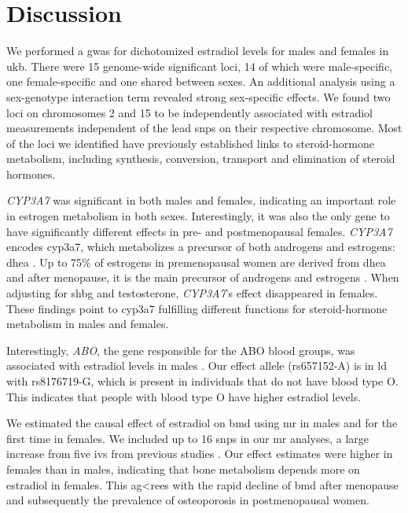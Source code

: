 \documentclass[draft]{scrbook}
\begin{document}
\section{Discussion} \label{sec:p1discussion}
We performed a \gls{gwas} for dichotomized estradiol levels for males and females in \gls{ukb}.
There were 15 genome-wide significant loci, 14 of which were male-specific, one female-specific and one shared between sexes.
An additional analysis using a sex-genotype interaction term revealed strong sex-specific effects.
We found two loci on chromosomes 2 and 15 to be independently associated with estradiol measurements independent of the lead \glspl{snp} on their respective chromosome.
Most of the loci we identified have previously established links to steroid-hormone metabolism, including synthesis, conversion, transport and elimination of steroid hormones.

\textit{CYP3A7} was significant in both males and females, indicating an important role in estrogen metabolism in both sexes.
Interestingly, it was also the only gene to have significantly different effects in pre- and postmenopausal females.
\textit{CYP3A7} encodes \gls{cyp3a7}, which metabolizes a precursor of both androgens and estrogens: \gls{dhea} \cite{Ohmori1998}.
Up to 75\% of estrogens in premenopausal women are derived from \gls{dhea} and after menopause, it is the main precursor of androgens and estrogens \cite{Simpson2001}.
When adjusting for \gls{shbg} and testosterone, \textit{CYP3A7}'s effect disappeared in females.
These findings point to \gls{cyp3a7} fulfilling different functions for steroid-hormone metabolism in males and females.

Interestingly, \textit{ABO}, the gene responsible for the ABO blood groups, was associated with estradiol levels in males \cite{Ogasawara1996}.
Our effect allele (rs657152-A) is in \gls{ld} with rs8176719-G, which is present in individuals that do not have blood type O.
This indicates that people with blood type O have higher estradiol levels.

We estimated the causal effect of estradiol on \gls{bmd} using \gls{mr} in males and for the first time in females.
We included up to 16 \glspl{snp} in our \gls{mr} analyses, a large increase from five \glspl{iv} from previous studies \cite{Nethander2018a}.
Our effect estimates were higher in females than in males, indicating that bone metabolism depends more on estradiol in females.
This ag<rees with the rapid decline of \gls{bmd} after menopause and subsequently the prevalence of osteoporosis in postmenopausal women.
\end{document}
